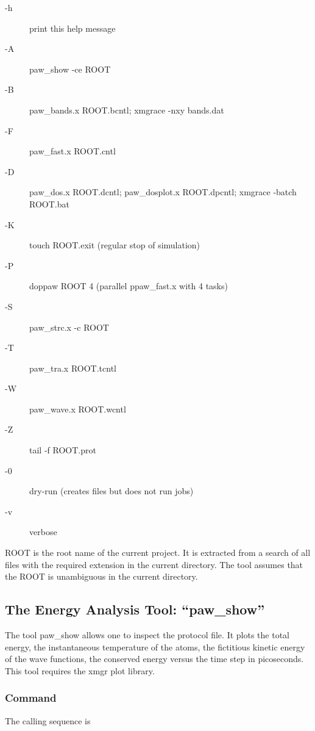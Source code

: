 \documentclass[final,12pt]{article}
\begin{document}
{{{{{{\begin{description}
\item[-h] print this help message
\item[-A] paw\_show -ce ROOT
\item[-B] paw\_bands.x ROOT.bcntl; xmgrace -nxy bands.dat
\item[-F] paw\_fast.x ROOT.cntl 
\item[-D] paw\_dos.x ROOT.dcntl; paw\_dosplot.x ROOT.dpcntl; 
  xmgrace -batch ROOT.bat
\item[-K] touch ROOT.exit (regular stop of simulation)
\item[-P] doppaw ROOT 4 (parallel ppaw\_fast.x with 4 tasks)
\item[-S] paw\_strc.x -c ROOT
\item[-T] paw\_tra.x ROOT.tcntl
\item[-W] paw\_wave.x ROOT.wcntl
\item[-Z] tail -f ROOT.prot
\item[-0] dry-run (creates files but does not run jobs)
\item[-v] verbose
\end{description}

ROOT is the root name of the current project. It is extracted from a
search of all files with the required extension in the current
directory.  The tool assumes that the ROOT is unambiguous in the
current directory.

\subsection{The Energy Analysis Tool: ``paw\_show''}
\label{sec:pawshow}
The tool paw\_show allows one to inspect the protocol file. It plots the
total energy, the instantaneous temperature of the atoms, the
fictitious kinetic energy of the wave functions, the conserved energy
versus the time step in picoseconds. This tool requires the xmgr plot
library\cite{xmgrace}.

\subsubsection{Command}

The calling sequence is

}}}}}}
\end{document}
